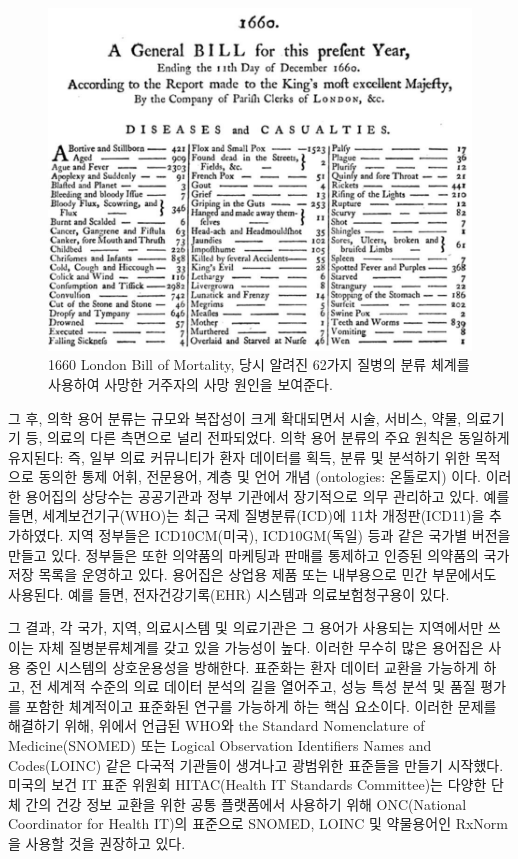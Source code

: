 \documentclass[11pt]{book}
\theoremstyle{definition}
\theoremstyle{definition}
\theoremstyle{definition}
\theoremstyle{remark}
\begin{document}
\begin{figure}

{\centering \includegraphics[width=1\linewidth]{images/StandardizedVocabularies/bill} 

}

\caption{1660 London Bill of Mortality, 당시 알려진 62가지 질병의 분류 체계를 사용하여 사망한 거주자의 사망 원인을 보여준다.}\label{fig:bill}
\end{figure}

그 후, 의학 용어 분류는 규모와 복잡성이 크게 확대되면서 시술, 서비스,
약물, 의료기기 등, 의료의 다른 측면으로 널리 전파되었다. 의학 용어
분류의 주요 원칙은 동일하게 유지된다: 즉, 일부 의료 커뮤니티가 환자
데이터를 획득, 분류 및 분석하기 위한 목적으로 동의한 통제 어휘,
전문용어, 계층 및 언어 개념 (ontologies: 온톨로지) 이다. 이러한 용어집의
상당수는 공공기관과 정부 기관에서 장기적으로 의무 관리하고 있다. 예를
들면, 세계보건기구(WHO)는 최근 국제 질병분류(ICD)에 11차 개정판(ICD11)을
추가하였다. 지역 정부들은 ICD10CM(미국), ICD10GM(독일) 등과 같은 국가별
버전을 만들고 있다. 정부들은 또한 의약품의 마케팅과 판매를 통제하고
인증된 의약품의 국가 저장 목록을 운영하고 있다. 용어집은 상업용 제품
또는 내부용으로 민간 부문에서도 사용된다. 예를 들면, 전자건강기록(EHR)
시스템과 의료보험청구용이 있다.

그 결과, 각 국가, 지역, 의료시스템 및 의료기관은 그 용어가 사용되는
지역에서만 쓰이는 자체 질병분류체계를 갖고 있을 가능성이 높다. 이러한
무수히 많은 용어집은 사용 중인 시스템의 상호운용성을 방해한다. 표준화는
환자 데이터 교환을 가능하게 하고, 전 세계적 수준의 의료 데이터 분석의
길을 열어주고, 성능 특성 분석 및 품질 평가를 포함한 체계적이고 표준화된
연구를 가능하게 하는 핵심 요소이다. 이러한 문제를 해결하기 위해, 위에서
언급된 WHO와 the Standard Nomenclature of Medicine(SNOMED) 또는 Logical
Observation Identifiers Names and Codes(LOINC) 같은 다국적 기관들이
생겨나고 광범위한 표준들을 만들기 시작했다. 미국의 보건 IT 표준 위원회
HITAC(Health IT Standards Committee)는 다양한 단체 간의 건강 정보 교환을
위한 공통 플랫폼에서 사용하기 위해 ONC(National Coordinator for Health
IT)의 표준으로 SNOMED, LOINC 및 약물용어인 RxNorm을 사용할 것을 권장하고
있다.
\end{document}
